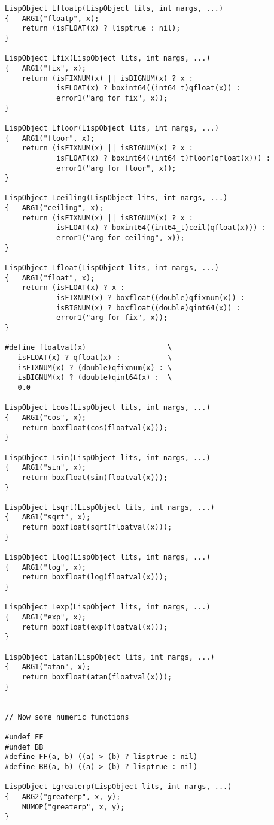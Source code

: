 {\begin{verbatim}
LispObject Lfloatp(LispObject lits, int nargs, ...)
{   ARG1("floatp", x);
    return (isFLOAT(x) ? lisptrue : nil);
}

LispObject Lfix(LispObject lits, int nargs, ...)
{   ARG1("fix", x);
    return (isFIXNUM(x) || isBIGNUM(x) ? x :
            isFLOAT(x) ? boxint64((int64_t)qfloat(x)) :
            error1("arg for fix", x));
}

LispObject Lfloor(LispObject lits, int nargs, ...)
{   ARG1("floor", x);
    return (isFIXNUM(x) || isBIGNUM(x) ? x :
            isFLOAT(x) ? boxint64((int64_t)floor(qfloat(x))) :
            error1("arg for floor", x));
}

LispObject Lceiling(LispObject lits, int nargs, ...)
{   ARG1("ceiling", x);
    return (isFIXNUM(x) || isBIGNUM(x) ? x :
            isFLOAT(x) ? boxint64((int64_t)ceil(qfloat(x))) :
            error1("arg for ceiling", x));
}

LispObject Lfloat(LispObject lits, int nargs, ...)
{   ARG1("float", x);
    return (isFLOAT(x) ? x :
            isFIXNUM(x) ? boxfloat((double)qfixnum(x)) :
            isBIGNUM(x) ? boxfloat((double)qint64(x)) :
            error1("arg for fix", x));
}

#define floatval(x)                   \
   isFLOAT(x) ? qfloat(x) :           \
   isFIXNUM(x) ? (double)qfixnum(x) : \
   isBIGNUM(x) ? (double)qint64(x) :  \
   0.0

LispObject Lcos(LispObject lits, int nargs, ...)
{   ARG1("cos", x);
    return boxfloat(cos(floatval(x)));
}

LispObject Lsin(LispObject lits, int nargs, ...)
{   ARG1("sin", x);
    return boxfloat(sin(floatval(x)));
}

LispObject Lsqrt(LispObject lits, int nargs, ...)
{   ARG1("sqrt", x);
    return boxfloat(sqrt(floatval(x)));
}

LispObject Llog(LispObject lits, int nargs, ...)
{   ARG1("log", x);
    return boxfloat(log(floatval(x)));
}

LispObject Lexp(LispObject lits, int nargs, ...)
{   ARG1("exp", x);
    return boxfloat(exp(floatval(x)));
}

LispObject Latan(LispObject lits, int nargs, ...)
{   ARG1("atan", x);
    return boxfloat(atan(floatval(x)));
}


// Now some numeric functions

#undef FF
#undef BB
#define FF(a, b) ((a) > (b) ? lisptrue : nil)
#define BB(a, b) ((a) > (b) ? lisptrue : nil)

LispObject Lgreaterp(LispObject lits, int nargs, ...)
{   ARG2("greaterp", x, y);
    NUMOP("greaterp", x, y);
}


\end{verbatim}}
